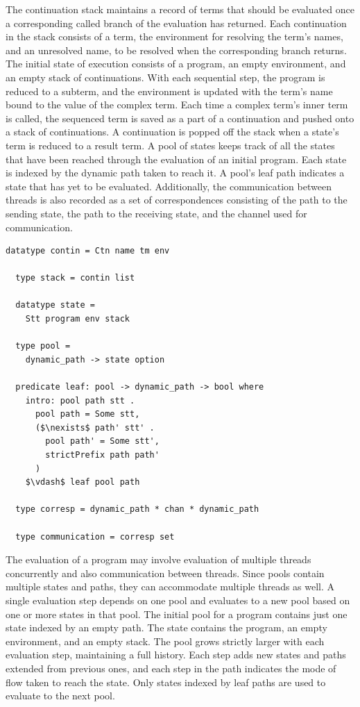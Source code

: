 \documentclass[letterpaper, 11pt]{report}
\begin{document}
The continuation stack maintains a record of terms that should be evaluated
once a corresponding called branch of the evaluation has returned.
Each continuation in the stack consists of a term, the environment for resolving the
term's names, and an unresolved name, to be resolved when the corresponding branch returns. 
The initial state of execution consists of a program, an empty environment, and an empty stack
of continuations. With each sequential step, the program is reduced to a subterm,
and the environment is updated with the term's name bound to the value of the complex term.
Each time a complex term's inner term is called, the sequenced term is saved as a part of a continuation
and pushed onto a stack of continuations. A continuation is popped off the stack when a
state's term is reduced to a result term. A pool of states keeps track of all the states
that have been reached through the evaluation of an initial program. Each state is indexed by
the dynamic path taken to reach it. A pool's leaf path indicates a state that has yet to be
evaluated. Additionally, the communication between threads is also recorded as a set of
correspondences consisting of the path to the sending state, the path to the receiving state,
and the channel used for communication.

\begin{lstlisting}[language=logic, mathescape]
  datatype contin = Ctn name tm env

  type stack = contin list

  datatype state =
    Stt program env stack 

  type pool =
    dynamic_path -> state option

  predicate leaf: pool -> dynamic_path -> bool where
    intro: pool path stt .
      pool path = Some stt,
      ($\nexists$ path' stt' .
        pool path' = Some stt',
        strictPrefix path path'
      )
    $\vdash$ leaf pool path

  type corresp = dynamic_path * chan * dynamic_path

  type communication = corresp set 
\end{lstlisting}

The evaluation of a program may involve evaluation of multiple threads concurrently and also
communication between threads. Since pools contain multiple states and paths, they can
accommodate multiple threads as well. A single evaluation step depends on one pool and
evaluates to a new pool based on one or more states in that pool. The initial pool for a
program contains just one state indexed by an empty path. The state contains the program, an
empty environment, and an empty stack. The pool grows strictly larger with each evaluation
step, maintaining a full history. Each step adds new states and paths extended from previous
ones, and each step in the path indicates the mode of flow taken to reach the state.
Only states indexed by leaf paths are used to evaluate to the next pool.
\end{document}

